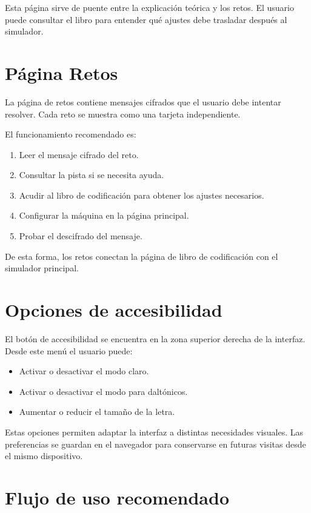 Esta página sirve de puente entre la explicación teórica y los retos. El usuario puede consultar el libro para entender qué ajustes debe trasladar después al simulador.

\section{Página Retos}

La página de retos contiene mensajes cifrados que el usuario debe intentar resolver. Cada reto se muestra como una tarjeta independiente.

El funcionamiento recomendado es:

\begin{enumerate}
	\item Leer el mensaje cifrado del reto.
	\item Consultar la pista si se necesita ayuda.
	\item Acudir al libro de codificación para obtener los ajustes necesarios.
	\item Configurar la máquina en la página principal.
	\item Probar el descifrado del mensaje.
\end{enumerate}

De esta forma, los retos conectan la página de libro de codificación con el simulador principal.

\section{Opciones de accesibilidad}

El botón de accesibilidad se encuentra en la zona superior derecha de la interfaz. Desde este menú el usuario puede:

\begin{itemize}
	\item Activar o desactivar el modo claro.
	\item Activar o desactivar el modo para daltónicos.
	\item Aumentar o reducir el tamaño de la letra.
\end{itemize}

Estas opciones permiten adaptar la interfaz a distintas necesidades visuales. Las preferencias se guardan en el navegador para conservarse en futuras visitas desde el mismo dispositivo.

\section{Flujo de uso recomendado}

